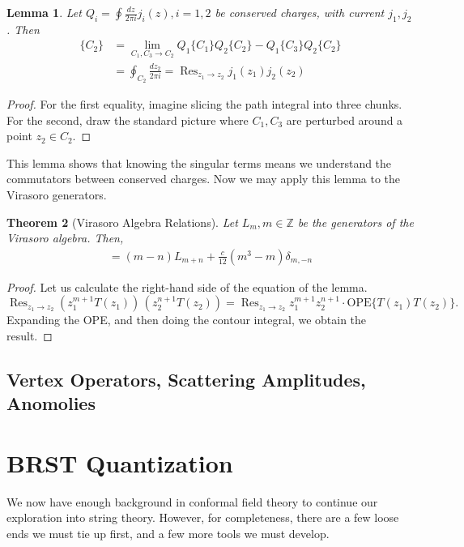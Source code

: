 \documentclass{report}
\theoremstyle{plain}
\newtheorem{theorem}{Theorem}[section]
\newtheorem{lemma}[theorem]{Lemma}
\theoremstyle{definition}
\theoremstyle{remark}
\newcommand{\FR}[2]{\frac{#1}{#2}}
\newcommand{\bZ}{\mathbb{Z}}
\DeclareMathOperator{\Res}{Res}
\begin{document}
\begin{lemma} Let $Q_i = \oint \FR{dz}{2\pi i} j_i(z), i=1,2$ be conserved
charges, with current $j_1,j_2$. Then
\begin{align*}
    [Q_1,Q_2]\{C_2\} &= \lim_{C_1,C_3 \to C_2} Q_1\{C_1\}Q_2\{C_2\}
    - Q_1\{C_3\} Q_2\{C_2\}\\
    &= \oint_{C_2} \FR{dz_2}{2\pi i} = \Res_{z_1\to z_2} j_1(z_1)j_2(z_2)
\end{align*}
\end{lemma}
\begin{proof}
For the first equality, imagine slicing the path integral into three chunks.
For the second, draw the standard picture where $C_1,C_3$ are perturbed
around a point $z_2\in C_2$.
\end{proof}
This lemma shows that knowing the singular terms means we understand the
commutators between conserved charges. Now we may apply this lemma to the
Virasoro generators.
\begin{theorem}[Virasoro Algebra Relations]
Let $L_m, m\in\bZ$ be the generators of the Virasoro algebra. Then,
\begin{align}
    [L_m,L_n] = (m-n)L_{m+n} + \FR{c}{12}(m^3-m)\delta_{m,-n}
    \label{Virasorogeneratorrelations}
\end{align}
\end{theorem}
\begin{proof}
Let us calculate the right-hand side of the equation of the lemma.
\[ \Res_{z_1\to z_2} (z_1^{m+1}T(z_1))\,(z_2^{n+1}T(z_2)) =\Res_{z_1\to z_2} z_1^{m+1}z_2^{n+1}\cdot \mathrm{OPE}\{T(z_1)T(z_2)\}. \]
Expanding the OPE, and then doing the contour integral, we obtain the
result.
\end{proof}

\section{Vertex Operators, Scattering Amplitudes, Anomolies}

\chapter{BRST Quantization}

We now have enough background in conformal field theory to continue
our exploration into string theory. However, for completeness, there
are a few loose ends we must tie up first, and a few more tools we
must develop.
\end{document}
